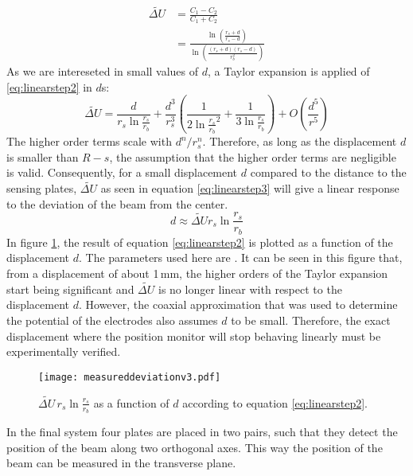 \begin{align}
\widetilde{\Delta U} &= \frac{C_1-C_2}{C_1+C_2} \nonumber \\
&= \frac{\ln\left(\frac{r_s+d}{r_s-d}\right)}{\ln\left(\frac{(r_s+d)(r_s-d)}{r_b^2}\right)}\label{eq:linearstep2}
\end{align}
As we are intereseted in small values of $d$, a Taylor expansion is applied of \ref{eq:linearstep2} in $d$s:
\begin{equation}
\widetilde{\Delta U}=\frac{d}{r_s\ln\frac{r_s}{r_b}} + \frac{d^3}{r_s^3}\left(\frac{1}{2\ln\frac{r_s}{r_b}^2}+\frac{1}{3\ln\frac{r_s}{r_b}}\right)+O(\frac{d^5}{r^5}) \label{eq:linearstep3}
\end{equation}
The higher order terms scale with $d^n/r_s^n$. Therefore, as long as the displacement $d$ is smaller than $R-s$, the assumption that the higher order terms are negligible is valid. Consequently, for a small displacement $d$ compared to the distance to the sensing plates, $\widetilde{\Delta U}$ as seen in equation \ref{eq:linearstep3} will give a linear response to the deviation of the beam from the center. 
\begin{equation}
d\approx\widetilde{\Delta U}r_s\ln\frac{r_s}{r_b}
\label{eq:reversecal}
\end{equation}
In figure \ref{fig:measd}, the result of equation \ref{eq:linearstep2} is plotted as a function of the displacement $d$. The parameters used here are .
It can be seen in this figure that, from a displacement of about 1\,mm, the higher orders of the Taylor expansion start being significant and $\widetilde{\Delta U}$ is no longer linear with respect to the displacement $d$. However, the coaxial approximation that was used to determine the potential of the electrodes also assumes $d$ to be small. Therefore, the exact displacement where the position monitor will stop behaving linearly must be experimentally verified.
\begin{figure}[h]
\centering
\texttt{[image: measureddeviationv3.pdf]}
\caption{ $\widetilde{\Delta U}\,r_s\ln\frac{r_s}{r_b}$ as a function of $d$ according to equation \ref{eq:linearstep2}.}
\label{fig:measd}
\end{figure}
In the final system four plates are placed in two pairs, such that they detect the position of the beam along two orthogonal axes. This way the position of the beam can be measured in the transverse plane.

